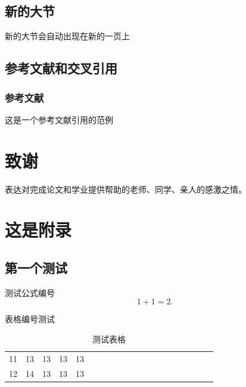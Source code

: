 \documentclass[]{WHUBachelor}
\begin{document}
	\section{新的大节}
	新的大节会自动出现在新的一页上
	\section{参考文献和交叉引用}\label{sec:ref}
	\subsection{参考文献}
  这是一个参考文献引用的范例\cite{Stone_1998}

  

  \chapter*{致谢}
  表达对完成论文和学业提供帮助的老师、同学、亲人的感激之情。


  \appendix

  \chapter{这是附录}

  \section{第一个测试}
  测试公式编号
  \begin{equation}
    1+1=2.
  \end{equation}

  表格编号测试

  \begin{table}[h]
    \centering
    \caption{测试表格}
    \begin{tabular}{*{20}c}
      \hline
      11 & 13  & 13  & 13  & 13 \\
      12 & 14  & 13  & 13  & 13 \\
      \hline
    \end{tabular}
  \end{table}
\end{document}
